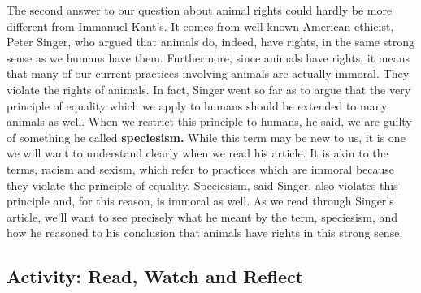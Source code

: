 \documentclass[
]{book}
\begin{document}
The second answer to our question about animal rights could hardly be more different from Immanuel Kant's. It comes from well-known American ethicist, Peter Singer, who argued that animals do, indeed, have rights, in the same strong sense as we humans have them. Furthermore, since animals have rights, it means that many of our current practices involving animals are actually immoral. They violate the rights of animals. In fact, Singer went so far as to argue that the very principle of equality which we apply to humans should be extended to many animals as well. When we restrict this principle to humans, he said, we are guilty of something he called \textbf{speciesism.} While this term may be new to us, it is one we will want to understand clearly when we read his article. It is akin to the terms, racism and sexism, which refer to practices which are immoral because they violate the principle of equality. Speciesism, said Singer, also violates this principle and, for this reason, is immoral as well. As we read through Singer's article, we'll want to see precisely what he meant by the term, speciesism, and how he reasoned to his conclusion that animals have rights in this strong sense.

\hypertarget{activity-read-watch-and-reflect-10}{%
\subsection*{Activity: Read, Watch and Reflect}\label{activity-read-watch-and-reflect-10}}
\end{document}
